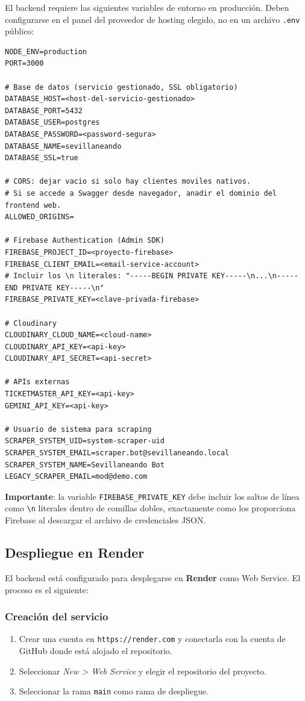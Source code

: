 El backend requiere las siguientes variables de entorno en producción. Deben configurarse en el panel del proveedor de hosting elegido, no en un archivo \texttt{.env} público:

\begin{lstlisting}
NODE_ENV=production
PORT=3000

# Base de datos (servicio gestionado, SSL obligatorio)
DATABASE_HOST=<host-del-servicio-gestionado>
DATABASE_PORT=5432
DATABASE_USER=postgres
DATABASE_PASSWORD=<password-segura>
DATABASE_NAME=sevillaneando
DATABASE_SSL=true

# CORS: dejar vacio si solo hay clientes moviles nativos.
# Si se accede a Swagger desde navegador, anadir el dominio del frontend web.
ALLOWED_ORIGINS=

# Firebase Authentication (Admin SDK)
FIREBASE_PROJECT_ID=<proyecto-firebase>
FIREBASE_CLIENT_EMAIL=<email-service-account>
# Incluir los \n literales: "-----BEGIN PRIVATE KEY-----\n...\n-----END PRIVATE KEY-----\n"
FIREBASE_PRIVATE_KEY=<clave-privada-firebase>

# Cloudinary
CLOUDINARY_CLOUD_NAME=<cloud-name>
CLOUDINARY_API_KEY=<api-key>
CLOUDINARY_API_SECRET=<api-secret>

# APIs externas
TICKETMASTER_API_KEY=<api-key>
GEMINI_API_KEY=<api-key>

# Usuario de sistema para scraping
SCRAPER_SYSTEM_UID=system-scraper-uid
SCRAPER_SYSTEM_EMAIL=scraper.bot@sevillaneando.local
SCRAPER_SYSTEM_NAME=Sevillaneando Bot
LEGACY_SCRAPER_EMAIL=mod@demo.com
\end{lstlisting}

\textbf{Importante}: la variable \texttt{FIREBASE\_PRIVATE\_KEY} debe incluir los saltos de línea como \texttt{\textbackslash n} literales dentro de comillas dobles, exactamente como los proporciona Firebase al descargar el archivo de credenciales JSON.

\subsection{Despliegue en Render}

El backend está configurado para desplegarse en \textbf{Render} como Web Service. El proceso es el siguiente:

\subsubsection{Creación del servicio}

\begin{enumerate}
    \item Crear una cuenta en \texttt{https://render.com} y conectarla con la cuenta de GitHub donde está alojado el repositorio.
    \item Seleccionar \textit{New > Web Service} y elegir el repositorio del proyecto.
    \item Seleccionar la rama \texttt{main} como rama de despliegue.
\end{enumerate}

